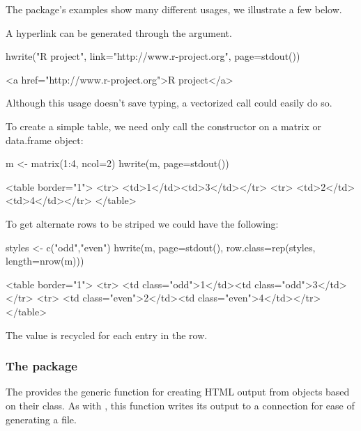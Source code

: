 The package's examples show many different usages, we illustrate a few below.


A hyperlink can be generated through the  argument.
\begin{Schunk}
\begin{Sinput}
 hwrite("R project", link="http://www.r-project.org",
        page=stdout())
\end{Sinput}
\begin{Soutput}
<a href="http://www.r-project.org">R project</a>
\end{Soutput}
\end{Schunk}
Although this usage doesn't save typing, a vectorized call could
easily do so.


To create a simple table, we need only call the constructor on a matrix or
data.frame object:
\begin{Schunk}
\begin{Sinput}
 m <- matrix(1:4, ncol=2)
 hwrite(m, page=stdout())
\end{Sinput}
\begin{Soutput}
<table border="1">
<tr>
<td>1</td><td>3</td></tr>
<tr>
<td>2</td><td>4</td></tr>
</table>
\end{Soutput}
\end{Schunk}


To get alternate rows to be striped we could have the following:
\begin{Schunk}
\begin{Sinput}
 styles <- c("odd","even")
 hwrite(m, page=stdout(), row.class=rep(styles, length=nrow(m)))
\end{Sinput}
\begin{Soutput}
<table border="1">
<tr>
<td class="odd">1</td><td class="odd">3</td></tr>
<tr>
<td class="even">2</td><td class="even">4</td></tr>
</table>
\end{Soutput}
\end{Schunk}
The  value is recycled for each entry in the row.


\subsubsection{The  package}
\label{sec:pkgr2html-package}

The  provides the generic function  for
creating HTML output from \R\/ objects based on their class.  As with
, this function writes its output to a connection for ease of
generating a file.

